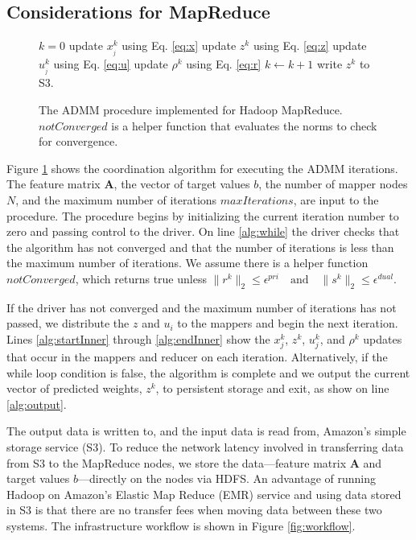 \documentclass[10pt, conference, compsocconf]{IEEEtran}
\begin{document}
\subsection{Considerations for MapReduce}
\begin{figure}
\begin{algorithmic}[1]
  \State $k=0$
  \label{alg:while}
    \label{alg:startInner}
      \State update $x_{_j}^k$ using Eq. \ref{eq:x}
    \EndFor
    \State update $z^k$ using Eq. \ref{eq:z}
       \State update $u_{_j}^k$ using Eq. \ref{eq:u}
    \EndFor
    \State update $\rho^k$ using Eq. \ref{eq:r}
    \State $k \gets k + 1$\label{alg:endInner}
  \EndWhile
  \State write $z^k$ to S3.\label{alg:output}
\EndProcedure
\end{algorithmic}
\caption{The ADMM procedure implemented for Hadoop MapReduce.  $notConverged$ is a helper function that evaluates the norms to check for convergence.}
\label{alg:admm}
\end{figure}

Figure \ref{alg:admm} shows the coordination algorithm for executing the ADMM iterations.  The feature matrix $\mathbf{A}$, the
vector of target values $b$, the number of mapper nodes $N$, and the maximum number of iterations $maxIterations$, are input to the procedure.  The procedure begins by initializing the current iteration number to zero and passing control to the driver.  On line \ref{alg:while} the driver checks that the algorithm has not converged and that the number of iterations is less than the maximum number of iterations.  We assume there is a helper function $notConverged$, which returns true unless $\|r^k\|_2 \le \epsilon^{pri} \quad\text{and}\quad \|s^k\|_2 \le \epsilon^{dual}.$

If the driver has not converged and the maximum number of iterations has not passed, we distribute the $z$ and $u_i$ to the mappers and begin the next iteration.  Lines \ref{alg:startInner} through \ref{alg:endInner} show the $x_j^k$, $z^k$, $u_j^k$, and $\rho^k$ updates that occur in the mappers and reducer on each iteration.  Alternatively, if the while loop condition is false, the algorithm is complete and we output the current vector of predicted weights, $z^k$, to persistent storage and exit, as show on line \ref{alg:output}.

The output data is written to, and the input data is read from, Amazon's simple storage service (S3). To reduce the network latency involved in transferring data from S3 to the MapReduce nodes, we store the data---feature matrix $\mathbf{A}$ and target values $b$---directly on the nodes via HDFS.  An advantage of running Hadoop on Amazon's Elastic Map Reduce (EMR) service and using data stored in S3 is that there are no transfer fees when moving data between these two systems.  The infrastructure workflow is shown in Figure \ref{fig:workflow}.
\end{document}
